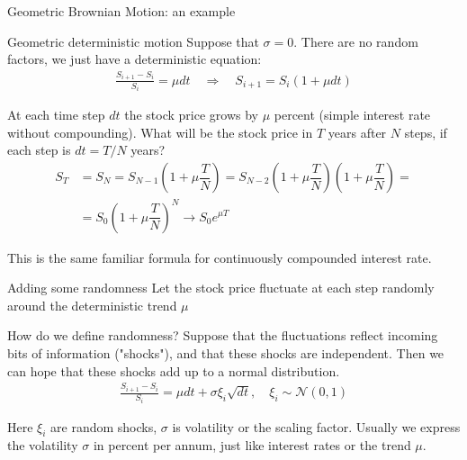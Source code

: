 \documentclass{beamer}
\begin{document}
\begin{frame}{Geometric Brownian Motion: an example}
\centering
{}
\end{frame}



\begin{frame}{Geometric deterministic motion}
\justify
Suppose that $\sigma=0$. There are no random factors, we just have a deterministic equation:
\begin{align*}
\frac{S_{i+1} - S_i}{S_i} = \mu dt \quad \Rightarrow \quad S_{i+1} = S_i(1 + \mu dt)
\end{align*}

\justify
At each time step $dt$ the stock price grows by $\mu$ percent (simple interest rate without compounding). What will be the stock price in $T$ years after $N$ steps, if each step is $dt=T/N$ years?
\begin{align*}
S_T &= S_N = S_{N-1}\left(1+\mu\dfrac{T}{N}\right) 
= S_{N-2}\left(1+\mu\dfrac{T}{N}\right)\left(1+\mu\dfrac{T}{N}\right) = \\
&= S_0\left(1+\mu\dfrac{T}{N}\right)^N \to S_0e^{\mu T}
\end{align*}

\justify
This is the same familiar formula for continuously compounded interest rate.
\end{frame}



\begin{frame}{Adding some randomness}
\justify
Let the stock price fluctuate at each step randomly around the deterministic trend $\mu$

\justify
How do we define randomness? Suppose that the fluctuations reflect incoming bits of information ("shocks"), and that these shocks are independent. Then we can hope that these shocks add up to a normal distribution.
 \begin{align*}
\frac{S_{i+1} - S_i}{S_i} = \mu dt + \sigma\xi_i\sqrt{dt}, \quad \xi_i \sim \mathcal{N}(0, 1)
\end{align*}

Here $\xi_i$ are random shocks, $\sigma$ is volatility or the scaling factor. Usually we express the volatility $\sigma$ in percent per annum, just like interest rates or the trend $\mu$.
\end{frame}
\end{document}
